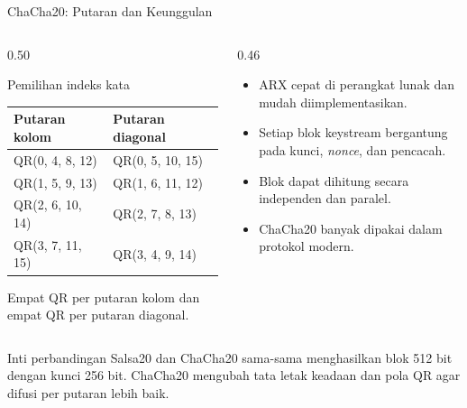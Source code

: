 \documentclass[aspectratio=169,11pt]{beamer}
\begin{document}
\begin{frame}{ChaCha20: Putaran dan Keunggulan}
    \footnotesize
    \begin{columns}[T,onlytextwidth]
        \begin{column}{0.50\textwidth}
            \begin{block}{Pemilihan indeks kata}
                \scriptsize
                \begin{tabular}{@{}ll@{}}
                    \toprule
                    Putaran kolom & Putaran diagonal \\
                    \midrule
                    QR(0, 4, 8, 12)  & QR(0, 5, 10, 15) \\
                    QR(1, 5, 9, 13)  & QR(1, 6, 11, 12) \\
                    QR(2, 6, 10, 14) & QR(2, 7, 8, 13) \\
                    QR(3, 7, 11, 15) & QR(3, 4, 9, 14) \\
                    \bottomrule
                \end{tabular}
            \end{block}
            {\scriptsize Empat QR per putaran kolom dan empat QR per putaran
            diagonal.}
        \end{column}
        \begin{column}{0.46\textwidth}
            \begin{itemize}
                \item ARX cepat di perangkat lunak dan mudah diimplementasikan.
                \item Setiap blok keystream bergantung pada kunci,
                      \textit{nonce}, dan pencacah.
                \item Blok dapat dihitung secara independen dan paralel.
                \item ChaCha20 banyak dipakai dalam protokol modern.
            \end{itemize}
        \end{column}
    \end{columns}
    \vspace{0.1cm}
    \begin{block}{Inti perbandingan}
        Salsa20 dan ChaCha20 sama-sama menghasilkan blok 512 bit dengan
        kunci 256 bit. ChaCha20 mengubah tata letak keadaan dan pola QR
        agar difusi per putaran lebih baik.
    \end{block}
\end{frame}
\end{document}
